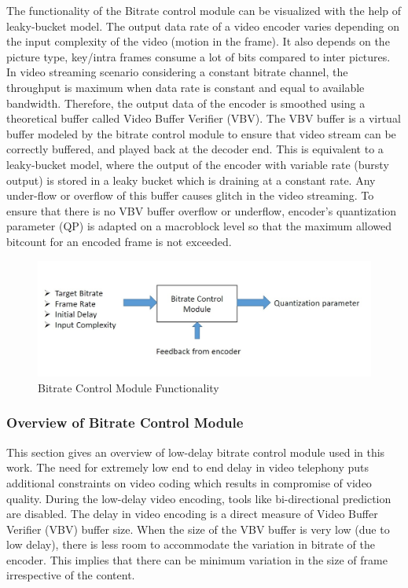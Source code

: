 \documentclass[11pt]{article} %
\begin{document}
	The functionality of the Bitrate control module can be visualized with the help of leaky-bucket model. The output data rate of a video encoder varies depending on the input complexity of the video (motion in the frame). It also depends on the picture type,  key/intra frames consume a lot of bits compared to inter pictures. In video streaming scenario considering a constant bitrate channel, the throughput is maximum when data rate is constant and equal to available bandwidth. Therefore, the output data of the encoder is smoothed using a theoretical buffer called Video Buffer Verifier (VBV). The VBV buffer is a virtual buffer modeled by the bitrate control module to ensure that video stream can be correctly buffered, and played back at the decoder end. This is equivalent to a leaky-bucket model, where the output of the encoder with variable rate (bursty output) is stored in a leaky bucket which is draining at a constant rate.  Any under-flow or overflow of this buffer causes glitch in the video streaming. To ensure that there is no VBV buffer overflow or underflow, encoder's quantization parameter (QP) is adapted on a macroblock level so that the maximum allowed bitcount for an encoded frame is not exceeded.
	
\begin{figure}[h]
    \centering
    \includegraphics[scale=0.5]{RC_block}
    \caption{Bitrate Control Module Functionality}
    \label{fig:Bitrate Control Module Functionality}
\end{figure} 

\subsubsection{Overview of Bitrate Control Module}
This section gives an overview of low-delay bitrate control module used in this work. The need for extremely low end to end delay in video telephony puts additional constraints on video coding which results in compromise of video quality. During the low-delay video encoding, tools like bi-directional prediction are disabled. The delay in video encoding is a direct measure of Video Buffer Verifier (VBV) buffer size. When the size of the VBV buffer is very low (due to low delay), there is less room to accommodate the variation in bitrate of the encoder. This implies that there can be minimum variation in the size of frame irrespective of the content.
 
\end{document}
